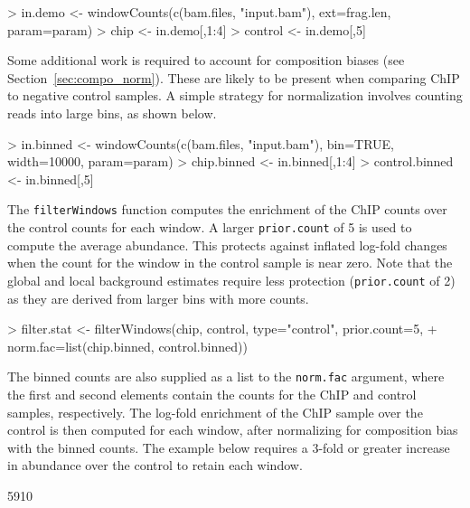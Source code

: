 \documentclass[12pt]{report}
\renewenvironment{Schunk}{\vspace{0pt}}{\vspace{0pt}}
\newcommand{\code}[1]{{\small\texttt{#1}}}
\begin{document}
\begin{Schunk}
\begin{Sinput}
> in.demo <- windowCounts(c(bam.files, "input.bam"), ext=frag.len, param=param)
> chip <- in.demo[,1:4]
> control <- in.demo[,5]
\end{Sinput}
\end{Schunk}

Some additional work is required to account for composition biases (see Section~\ref{sec:compo_norm}).
These are likely to be present when comparing ChIP to negative control samples.
A simple strategy for normalization involves counting reads into large bins, as shown below.

\begin{Schunk}
\begin{Sinput}
> in.binned <- windowCounts(c(bam.files, "input.bam"), bin=TRUE, width=10000, param=param)
> chip.binned <- in.binned[,1:4]
> control.binned <- in.binned[,5]
\end{Sinput}
\end{Schunk}

The \code{filterWindows} function computes the enrichment of the ChIP counts over the control counts for each window.
A larger \code{prior.count} of 5 is used to compute the average abundance.
This protects against inflated log-fold changes when the count for the window in the control sample is near zero.
Note that the global and local background estimates require less protection (\code{prior.count} of 2) as they are derived from larger bins with more counts.

\begin{Schunk}
\begin{Sinput}
> filter.stat <- filterWindows(chip, control, type="control", prior.count=5,
+     norm.fac=list(chip.binned, control.binned))
\end{Sinput}
\end{Schunk}

The binned counts are also supplied as a list to the \code{norm.fac} argument, where the first and second elements contain the counts for the ChIP and control samples, respectively.
The log-fold enrichment of the ChIP sample over the control is then computed for each window, after normalizing for composition bias with the binned counts.
The example below requires a 3-fold or greater increase in abundance over the control to retain each window.

\begin{Schunk}
\begin{Soutput}
[1] 5910
\end{Soutput}
\end{Schunk}
\end{document}
